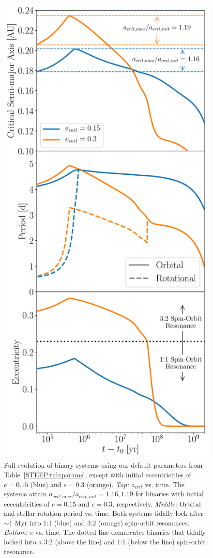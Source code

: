 \begin{figure}
	\includegraphics[scale=0.5]{ecc_comp.pdf}
   \caption{Full evolution of binary systems using our default parameters from Table~\ref{STEEP:tab:params}, except with initial eccentricities of $e = 0.15$ (blue) and $e = 0.3$ (orange).  {\it Top:} $a_{crit}$ vs. time.  The systems attain $a_{crit,max}/a_{crit,init} = 1.16, 1.19$ for binaries with initial eccentricities of $e = 0.15$ and $e = 0.3$, respectively. {\it Middle:} Orbital and stellar rotation period vs. time.  Both systems tidally lock after ${\sim}1$ Myr into 1:1 (blue) and 3:2 (orange) spin-orbit resonances.  {\it Bottom:} $e$ vs. time.  The dotted line demarcates binaries that tidally locked into a 3:2 (above the line) and 1:1 (below the line) spin-orbit resonance.}
    \label{STEEP:fig:ecc_comp}
\end{figure}


